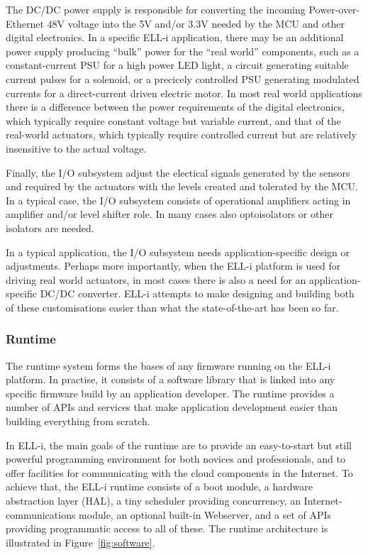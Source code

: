 \documentclass[draft,a4paper]{siamltex}
\begin{document}
The DC/DC power supply is responsible for converting the incoming
Power-over-Ethernet 48V voltage into the 5V and/or 3.3V needed by the
MCU and other digital electronics.  In a specific ELL-i application,
there may be an additional power supply producing ``bulk'' power for
the ``real world'' components, such as a constant-current PSU for a
high power LED light, a circuit generating suitable current pulses for
a solenoid, or a precicely controlled PSU generating modulated
currents for a direct-current driven electric motor.  In most real
world applications there is a difference between the power
requirements of the digital electronics, which typically require
constant voltage but variable current, and that of the real-world
actuators, which typically require controlled current but are
relatively insensitive to the actual voltage.

Finally, the I/O subsystem adjust the electical signals generated by
the sensors and required by the actuators with the levels created and
tolerated by the MCU.  In a typical case, the I/O subsystem consists
of operational amplifiers acting in amplifier and/or level shifter
role.  In many cases also optoisolators or other isolators are needed.

In a typical application, the I/O subsystem needs application-specific
design or adjustments.  Perhaps more importantly, when the ELL-i
platform is used for driving real world actuators, in most cases there
is also a need for an application-specific DC/DC converter.  ELL-i
attempts to make designing and building both of these customisations
easier than what the state-of-the-art has been so far.

\subsubsection{Runtime}
\label{sssec:runtime}

The runtime system forms the bases of any firmware running on the
ELL-i platform.  In practise, it consists of a software library that
is linked into any specific firmware build by an application
developer.  The runtime provides a number of APIs and services that make
application development easier than building everything from scratch.

In ELL-i, the main goals of the runtime are to provide an
easy-to-start but still powerful programming environment for both
novices and professionals, and to offer facilities for communicating
with the cloud components in the Internet.  To achieve that, the ELL-i
runtime consists of a boot module, a hardware abstraction layer (HAL),
a tiny scheduler providing concurrency, an Internet-communications
module, an optional built-in Webserver, and a set of APIs providing
programmatic access to all of these.  The runtime architecture is
illustrated in Figure~\ref{fig:software}.
\end{document}
